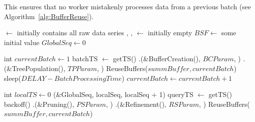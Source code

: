 {This ensures that no worker mistakenly processes data from a previous batch
(see Algorithm~\ref{alg:BufferReuse}).  


\begin{algorithm}[htbp]
    \footnotesize
    \vspace*{2mm}
    
    \begin{algorithmic}[1]
    
        \State \BC $\gets$ initially contains all raw data series
        \State \TP, \PS, \RS $\gets$ initially empty
        \State $\mathit{BSF} \gets$ some initial value
        \State $\mathit{GlobalSeq} \gets 0$
    \EndProcedure
    
    \vspace*{1mm}
    \vspace*{1mm}
    
        \State int $\mathit{currentBatch} \gets 1$
                \State batchTS $\gets$ getTS()
            \EndIf
            \State \BC.\Traverse(\&BufferCreation(), $\mathit{BCParam}$, \False)
            \State \TP.\Traverse(\&TreePopulation(), $\mathit{TPParam}$, \False)
                \State ReuseBuffers($\mathit{summBuffer}, \mathit{currentBatch}$)
            \EndFor
                \State sleep($\mathit{DELAY}-\mathit{BatchProcessingTime}$)
            \EndIf
            \State $\mathit{currentBatch} \gets \mathit{currentBatch} + 1$
        \EndWhile
    \EndProcedure
    
    \vspace*{1mm}
    \vspace*{1mm}
    
        \State int $\mathit{localTS} \gets 0$
                    \State \CAS(\&GlobalSeq, localSeq, localSeq + 1)
                \EndIf
                \State queryTS $\gets$ getTS()
                    \State backoff()
                \EndWhile
            \EndIf
            \State \PS.\Traverse(\&Pruning(), $\mathit{PSParam}$, \False)
            \State \TP.\Traverse(\&Refinement(), $\mathit{RSParam}$, \False)
                \State ReuseBuffers($\mathit{summBuffer}, \mathit{currentBatch}$)
            \EndFor
            

\end{algorithmic}
\end{algorithm}}
